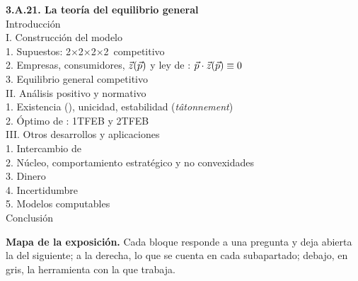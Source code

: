 \documentclass[11pt]{article}
\begin{document}
\begin{esquema}
\textbf{3.A.21. La teoría del equilibrio general}\\[2pt]
Introducción\\
I. Construcción del modelo\\
\hspace*{1.5em}1. Supuestos: 2×2×2×2~competitivo\\
\hspace*{1.5em}2. Empresas, consumidores, $\vec{z}(\vec{p})$ y ley de : $\vec{p}\cdot\vec{z}(\vec{p})\equiv 0$\\
\hspace*{1.5em}3. Equilibrio general competitivo\\
II. Análisis positivo y normativo\\
\hspace*{1.5em}1. Existencia (), unicidad, estabilidad (\emph{tâtonnement})\\
\hspace*{1.5em}2. Óptimo de : 1TFEB y 2TFEB\\
III. Otros desarrollos y aplicaciones\\
\hspace*{1.5em}1. Intercambio de \\
\hspace*{1.5em}2. Núcleo, comportamiento estratégico y no convexidades\\
\hspace*{1.5em}3. Dinero\\
\hspace*{1.5em}4. Incertidumbre\\
\hspace*{1.5em}5. Modelos computables\\
Conclusión
\end{esquema}

\begin{anotaciones}
\textbf{Mapa de la exposición.} Cada bloque responde a una pregunta y deja abierta la del siguiente; a la derecha, lo que se cuenta en cada subapartado; debajo, en gris, la herramienta con la que trabaja.
\begin{infografiacaja}
\caption{Mapa del tema: la pregunta de cada bloque, sus subapartados y el hilo que los une}\label{figu:mapa-tema}
\end{infografiacaja}
\end{anotaciones}
\end{document}
